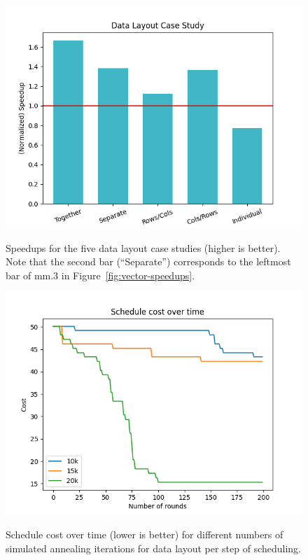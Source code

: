 \begin{figure}[t]
	\centering
    \includegraphics[width=0.9\linewidth]{figures/graphs/case_study.png}
    \caption{Speedups for the five data layout case studies (higher is better). Note that the second bar (``Separate'') corresponds to the leftmost bar of {\sf mm.3} in Figure~\ref{fig:vector-speedups}.}
    \label{fig:data-layout-case-study}
    
        \includegraphics[width=0.9\linewidth]{figures/graphs/schedules.png}
        \vspace{-1em}
    \caption{Schedule cost over time (lower is better) for different numbers of simulated annealing iterations for data layout per step of scheduling.}
    \label{fig:schedule-cost}
\end{figure}


